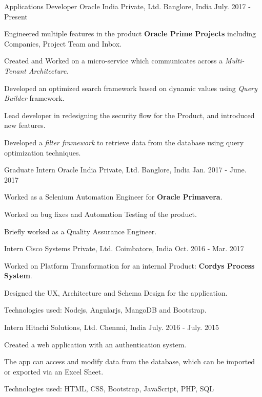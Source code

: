 \begin{cventries}
  \cventry
    {Applications Developer}
    {Oracle India Private, Ltd.}
    {Banglore, India}
    {July. 2017 - Present}
    {
      \begin{cvitems}
        \item {Engineered multiple features in the product \textbf{Oracle Prime Projects} including Companies, Project Team and Inbox.}
        \item {Created and Worked on a micro-service which communicates across a \textit{Multi-Tenant Architecture}.}
        \item {Developed an optimized search framework based on dynamic values using \textit{Query Builder} framework.}
        \item {Lead developer in redesigning the security flow for the Product, and introduced new features.}
        \item {Developed a \textit{filter framework} to retrieve data from the database using query optimization techniques.}
      \end{cvitems}
    }
  \cventry
    {Graduate Intern}
    {Oracle India Private, Ltd.}
    {Banglore, India}
    {Jan. 2017 - June. 2017}
    {
      \begin{cvitems}
        \item {Worked as a Selenium Automation Engineer for \textbf{Oracle Primavera}.}
        \item {Worked on bug fixes and Automation Testing of the product.}
        \item {Briefly worked as a Quality Assurance Engineer.}
      \end{cvitems}
    }
  \cventry
    {Intern}
    {Cisco Systems Private, Ltd.}
    {Coimbatore, India}
    {Oct. 2016 - Mar. 2017}
    {
      \begin{cvitems}
        \item {Worked on Platform Transformation for an internal Product: \textbf{Cordys Process System}.}
        \item {Designed the UX, Architecture and Schema Design for the application.}
        \item {Technologies used: Nodejs, Angularjs, MangoDB and Bootstrap.}
      \end{cvitems} 
    }
  \cventry
    {Intern}
    {Hitachi Solutions, Ltd.}
    {Chennai, India}
    {July. 2016 - July. 2015}
    {
      \begin{cvitems}
        \item {Created a web application with an authentication system.}
        \item {The app can access and modify data from the database, which can be imported or exported via an Excel Sheet.}
        \item {Technologies used: HTML, CSS, Bootstrap, JavaScript, PHP, SQL }
      \end{cvitems}
    }
\end{cventries}